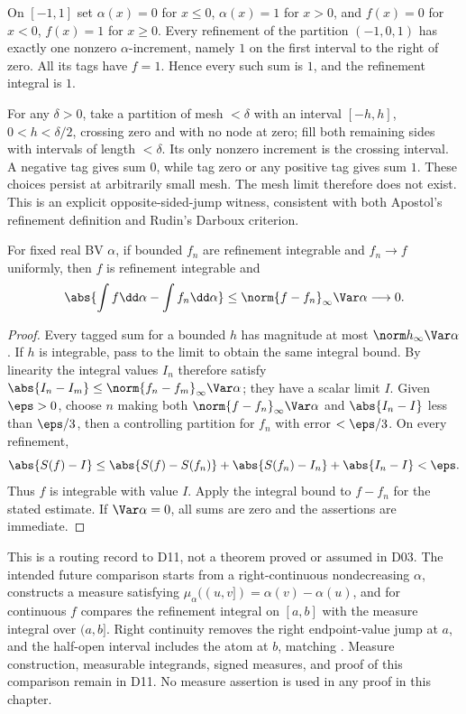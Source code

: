\begin{example}
On $[-1,1]$ set $\alpha(x)=0$ for $x\leq0$, $\alpha(x)=1$ for $x>0$, and $f(x)=0$ for $x<0$, $f(x)=1$ for $x\geq0$. Every refinement of the partition $(-1,0,1)$ has exactly one nonzero $\alpha$-increment, namely $1$ on the first interval to the right of zero. All its tags have $f=1$. Hence every such sum is $1$, and the refinement integral is $1$.

For any $\delta>0$, take a partition of mesh $<\delta$ with an interval $[-h,h]$, $0<h<\delta/2$, crossing zero and with no node at zero; fill both remaining sides with intervals of length $<\delta$. Its only nonzero increment is the crossing interval. A negative tag gives sum $0$, while tag zero or any positive tag gives sum $1$. These choices persist at arbitrarily small mesh. The mesh limit therefore does not exist. This is an explicit opposite-sided-jump witness, consistent with both Apostol's refinement definition and Rudin's Darboux criterion.
\end{example}

\begin{theorem}
For fixed real BV $\alpha$, if bounded $f_n$ are refinement integrable and $f_n\to f$ uniformly, then $f$ is refinement integrable and
\[\abs{\int f\dd\alpha-\int f_n\dd\alpha}\leq\norm{f-f_n}_\infty\Var\alpha\longrightarrow0.\]
\end{theorem}
\begin{proof}
Every tagged sum for a bounded $h$ has magnitude at most $\norm h_\infty\Var\alpha$. If $h$ is integrable, pass to the limit to obtain the same integral bound. By linearity the integral values $I_n$ therefore satisfy $\abs{I_n-I_m}\leq\norm{f_n-f_m}_\infty\Var\alpha$; they have a scalar limit $I$. Given $\eps>0$, choose $n$ making both $\norm{f-f_n}_\infty\Var\alpha$ and $\abs{I_n-I}$ less than $\eps/3$, then a controlling partition for $f_n$ with error $<\eps/3$. On every refinement,
\[\abs{S(f)-I}\leq\abs{S(f)-S(f_n)}+\abs{S(f_n)-I_n}+\abs{I_n-I}<\eps.\]
Thus $f$ is integrable with value $I$. Apply the integral bound to $f-f_n$ for the stated estimate. If $\Var\alpha=0$, all sums are zero and the assertions are immediate.
\end{proof}

\begin{remark}
This is a routing record to D11, not a theorem proved or assumed in D03. The intended future comparison starts from a right-continuous nondecreasing $\alpha$, constructs a measure satisfying $\mu_\alpha((u,v])=\alpha(v)-\alpha(u)$, and for continuous $f$ compares the refinement integral on $[a,b]$ with the measure integral over $(a,b]$. Right continuity removes the right endpoint-value jump at $a$, and the half-open interval includes the atom at $b$, matching . Measure construction, measurable integrands, signed measures, and proof of this comparison remain in D11. No measure assertion is used in any proof in this chapter.
\end{remark}

